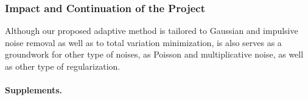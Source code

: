 \documentclass[enabledeprecatedfontcommands,cleardoublepage=empty,headsepline,twoside,11pt,DIV=15,BCOR=12mm,final]{scrartcl}
\begin{document}
\subsubsection*{Impact and Continuation of the Project}


Although our proposed adaptive method is tailored to Gaussian and impulsive noise removal as well as to total variation minimization, is also serves as a groundwork for other type of noises, as Poisson and multiplicative noise, as well as other type of regularization.

\paragraph*{Supplements.}


%
%
\end{document}
